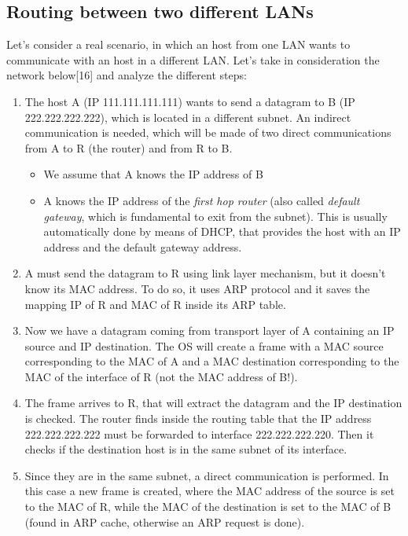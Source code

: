 \subsection{Routing between two different LANs}
Let's consider a real scenario, in which an host from one LAN wants to communicate with an host in a different LAN. Let's take in consideration the network below[16] and analyze the different steps:
\begin{enumerate}
    \item The host A (IP 111.111.111.111) wants to send a datagram to B (IP 222.222.222.222), which is located in a different subnet. An indirect communication is needed, which will be made of two direct communications from A to R (the router) and from R to B.
    \begin{itemize}
        \item We assume that A knows the IP address of B
        \item A knows the IP address of the \textit{first hop router} (also called \textit{default gateway}, which is fundamental to exit from the subnet). This is usually automatically done by means of DHCP, that provides the host with an IP address and the default gateway address.
    \end{itemize}
    \item A must send the datagram to R using link layer mechanism, but it doesn't know its MAC address. To do so, it uses ARP protocol and it saves the mapping IP of R and MAC of R inside its ARP table.
    \item Now we have a datagram coming from transport layer of A containing an IP source and IP destination. The OS will create a frame with a MAC source corresponding to the MAC of A and a MAC destination corresponding to the MAC of the interface of R (not the MAC address of B!).
    \item The frame arrives to R, that will extract the datagram and the IP destination is checked. The router finds inside the routing table that the IP address 222.222.222.222 must be forwarded to interface 222.222.222.220. Then it checks if the destination host is in the same subnet of its interface.
    \item Since they are in the same subnet, a direct communication is performed. In this case a new frame is created, where the MAC address of the source is set to the MAC of R, while the MAC of the destination is set to the MAC of B (found in ARP cache, otherwise an ARP request is done).
\end{enumerate}

